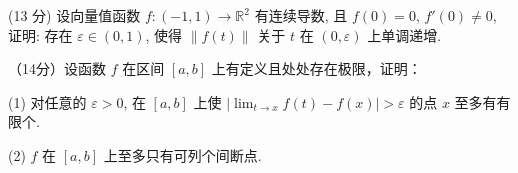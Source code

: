 \nopagebreak[4]
\par{}
(13 分) 设向量值函数 $f: (-1, 1) \to \mathbb{R}^2$ 有连续导数, 且 $f(0) = 0$, $f'(0) \neq 0$, 证明: 存在 $\varepsilon \in (0, 1)$, 使得 $\| f(t) \|$ 关于 $t$ 在 $(0, \varepsilon)$ 上单调递增.\par
\par{}
（14分）设函数 $f$ 在区间 $[a,b]$ 上有定义且处处存在极限，证明：\par
(1) 对任意的 $\varepsilon > 0$, 在 $[a, b]$ 上使 $\left|\lim_{t \to x} f(t) - f(x)\right| > \varepsilon$ 的点 $x$ 至多有有限个.\par
(2) $f$ 在 $[a, b]$ 上至多只有可列个间断点.\par
